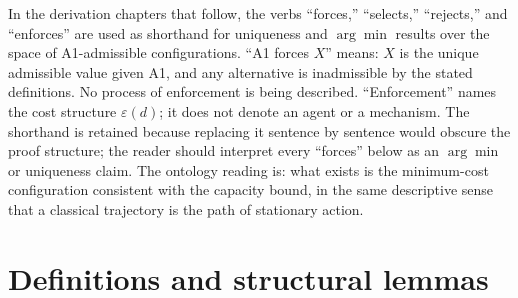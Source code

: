 \documentclass[11pt]{article}
\theoremstyle{remark}
\begin{document}

\begin{tcolorbox}[apfbox, title={Descriptive-framing convention (read once, applies throughout)}]
In the derivation chapters that follow, the verbs ``forces,'' ``selects,'' ``rejects,'' and ``enforces'' are used as shorthand for uniqueness and $\arg\min$ results over the space of A1-admissible configurations.  ``A1 forces $X$'' means: $X$ is the unique admissible value given A1, and any alternative is inadmissible by the stated definitions.  No process of enforcement is being described.  ``Enforcement'' names the cost structure $\varepsilon(d)$; it does not denote an agent or a mechanism.  The shorthand is retained because replacing it sentence by sentence would obscure the proof structure; the reader should interpret every ``forces'' below as an $\arg\min$ or uniqueness claim.  The ontology reading is: what exists is the minimum-cost configuration consistent with the capacity bound, in the same descriptive sense that a classical trajectory is the path of stationary action.
\end{tcolorbox}

\section{Definitions and structural lemmas}
\label{sec:defs}
\end{document}

